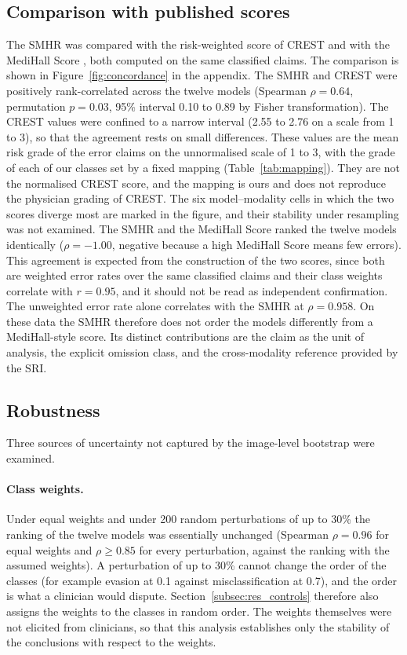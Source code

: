 \documentclass[11pt,a4paper]{article}
\newcommand{\SMHR}{\ensuremath{\mathrm{SMHR}}}
\newcommand{\SRI}{\ensuremath{\mathrm{SRI}}}
\begin{document}
\subsection{Comparison with published scores}
\label{subsec:res_metrics}

The \SMHR{} was compared with the risk-weighted score of CREST \citep{crest2025medrxiv} and with the MediHall Score \citep{chen2024medhallmark}, both computed on the same classified claims. The comparison is shown in Figure~\ref{fig:concordance} in the appendix. The \SMHR{} and CREST were positively rank-correlated across the twelve models (Spearman $\rho = 0.64$, permutation $p = 0.03$, 95\% interval 0.10 to 0.89 by Fisher transformation). The CREST values were confined to a narrow interval (2.55 to 2.76 on a scale from 1 to 3), so that the agreement rests on small differences. These values are the mean risk grade of the error claims on the unnormalised scale of 1 to 3, with the grade of each of our classes set by a fixed mapping (Table~\ref{tab:mapping}). They are not the normalised CREST score, and the mapping is ours and does not reproduce the physician grading of CREST. The six model--modality cells in which the two scores diverge most are marked in the figure, and their stability under resampling was not examined. The \SMHR{} and the MediHall Score ranked the twelve models identically ($\rho = -1.00$, negative because a high MediHall Score means few errors). This agreement is expected from the construction of the two scores, since both are weighted error rates over the same classified claims and their class weights correlate with $r = 0.95$, and it should not be read as independent confirmation. The unweighted error rate alone correlates with the \SMHR{} at $\rho = 0.958$. On these data the \SMHR{} therefore does not order the models differently from a MediHall-style score. Its distinct contributions are the claim as the unit of analysis, the explicit omission class, and the cross-modality reference provided by the \SRI{}.

\subsection{Robustness}
\label{subsec:res_robust}

Three sources of uncertainty not captured by the image-level bootstrap were examined.

\paragraph{Class weights.} Under equal weights and under 200 random perturbations of up to 30\% the ranking of the twelve models was essentially unchanged (Spearman $\rho = 0.96$ for equal weights and $\rho \geq 0.85$ for every perturbation, against the ranking with the assumed weights). A perturbation of up to 30\% cannot change the order of the classes (for example evasion at 0.1 against misclassification at 0.7), and the order is what a clinician would dispute. Section~\ref{subsec:res_controls} therefore also assigns the weights to the classes in random order. The weights themselves were not elicited from clinicians, so that this analysis establishes only the stability of the conclusions with respect to the weights.
\end{document}
